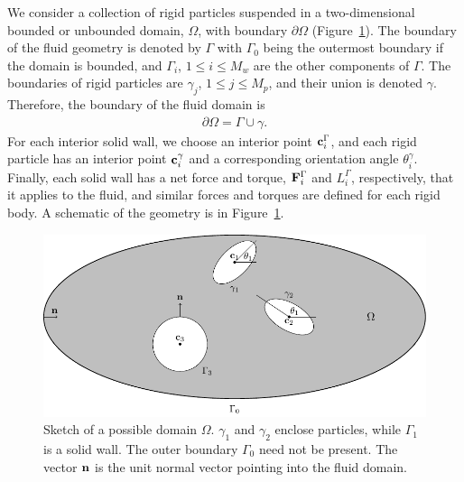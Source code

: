 \documentclass[preprint, 10pt]{elsarticle}
\begin{document}
We consider a collection of rigid particles suspended in a
two-dimensional bounded or unbounded domain, $\Omega$, with boundary
$\partial\Omega$ (Figure~\ref{fig:geomSchematic}).  The boundary of the
fluid geometry is denoted by $\Gamma$ with $\Gamma_0$ being the
outermost boundary if the domain is bounded, and $\Gamma_i$, $1\leq i
\leq M_w$ are the other components of $\Gamma$.  The boundaries of rigid
particles are $\gamma_j$, $1\leq j\leq M_p$, and their union is denoted
$\gamma$.  Therefore, the boundary of the fluid domain is
\begin{align*}
  \partial\Omega =\Gamma \cup \gamma.
\end{align*} 
For each interior solid wall, we choose an interior point
${\mathbf{c}}^\Gamma_i$, and each rigid particle has an interior point
${\mathbf{c}}^\gamma_i$ and a corresponding orientation angle $\theta^\gamma_i$.
Finally, each solid wall has a net force and torque, ${\mathbf{F}}^\Gamma_i$ and
$L^\Gamma_i$, respectively, that it applies to the fluid, and similar
forces and torques are defined for each rigid body.  A schematic of the
geometry is in Figure~\ref{fig:geomSchematic}.


%

\begin{figure}[!h]
\begin{center}
\includegraphics{figures/multiply_connected.pdf}
\end{center}
\caption{\label{fig:geomSchematic}Sketch of a possible domain $\Omega$.
$\gamma_1$ and $\gamma_2$ enclose particles, while $\Gamma_1$ is a solid
wall. The outer boundary $\Gamma_0$ need not be present.  The vector
${\mathbf{n}}$ is the unit normal vector pointing into the fluid domain.}
\end{figure}
\end{document}
